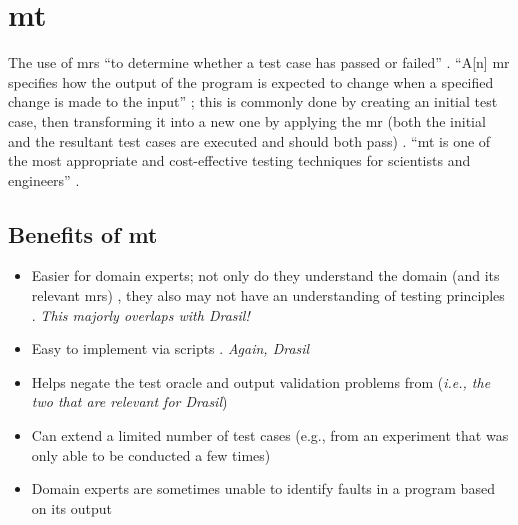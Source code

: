 \section[Metamorphic Testing (MT)]{\acf{mt}}
\label{chap:testing:sec:metamorphic-testing}
The use of \acfp{mr} ``to determine whether a test case has passed or failed''
\citep[p.~67]{KanewalaAndYuehChen2019}. ``A[n] \acs{mr} specifies how the
output of the program is expected to change when a specified change is made to
the input'' \citep[p.~67]{KanewalaAndYuehChen2019}; this is commonly done by
creating an initial test case, then transforming it into a new one by applying
the \acs{mr} (both the initial and the resultant test cases are executed and
should both pass) \citep[p.~68]{KanewalaAndYuehChen2019}. ``\acs{mt} is one of
the most appropriate and cost-effective testing techniques for scientists and
engineers'' \citep[p.~72]{KanewalaAndYuehChen2019}.

\subsection[Benefits of MT]{Benefits of \acs{mt}}
\begin{itemize}
      \item Easier for domain experts; not only do they understand the domain
            (and its relevant \acp{mr}) \citep[p.~70]{KanewalaAndYuehChen2019},
            they also may not have an understanding of testing principles
            \citep[p.~69]{KanewalaAndYuehChen2019}. \emph{This majorly
                  overlaps with Drasil!}
      \item Easy to implement via scripts \citep[p.~69]{KanewalaAndYuehChen2019}.
            \emph{Again, Drasil}
      \item Helps negate the test oracle \citep[p.~69]{KanewalaAndYuehChen2019}
            and output validation \citep[p.~70]{KanewalaAndYuehChen2019} problems
            from  (\emph{i.e.,
                  the two that are relevant for Drasil})
      \item Can extend a limited number of test cases (e.g., from an
            experiment that was only able to be conducted a few times)
            \citep[pp.~70-72]{KanewalaAndYuehChen2019}
      \item Domain experts are sometimes unable to identify faults in a program
            based on its output \citep[p.~71]{KanewalaAndYuehChen2019}
\end{itemize}


